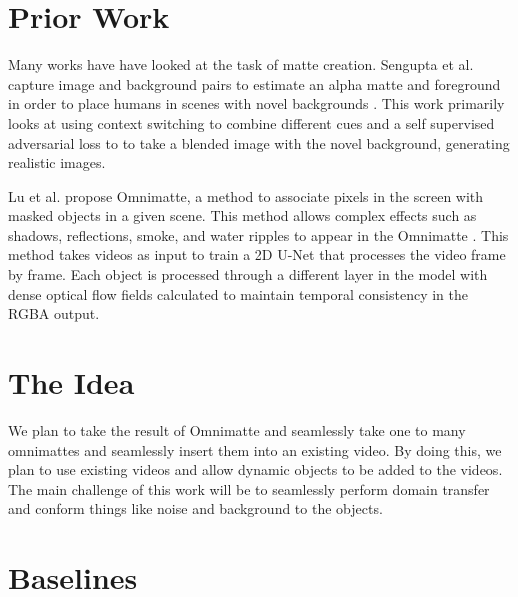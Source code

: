 \documentclass{amsart}
\begin{document}
\section{Prior Work}
Many works have have looked at the task of matte creation. Sengupta et al. capture image and background pairs to estimate an alpha matte and foreground in order to place humans in scenes with novel backgrounds \cite{BMSengupta20}. This work primarily looks at using context switching to combine different cues and a self supervised adversarial loss to to take a blended image with the novel background, generating realistic images.

Lu et al. propose Omnimatte, a method to associate pixels in the screen with masked objects in a given scene. This method allows complex effects such as shadows, reflections, smoke, and water ripples to appear in the Omnimatte \cite{lu2021}. This method takes videos as input to train a 2D U-Net that processes the video frame by frame. Each object is processed through a different layer in the model with dense optical flow fields calculated to maintain temporal consistency in the RGBA output.



\section{The Idea}
We plan to take the result of Omnimatte and seamlessly take one to many omnimattes and seamlessly insert them into an existing video. By doing this, we plan to use existing videos and allow dynamic objects to be added to the videos. The main challenge of this work will be to seamlessly perform domain transfer and conform things like noise and background to the objects.

\section{Baselines}

\printbibliography
\end{document}
